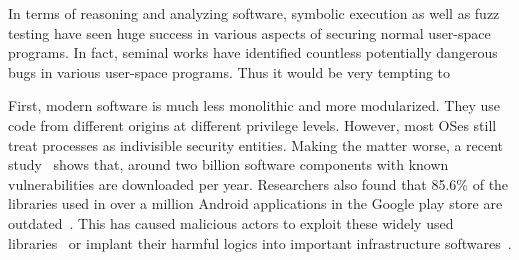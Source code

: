 In terms of reasoning and analyzing software, symbolic execution as well as fuzz testing have seen huge success in various aspects of securing normal user-space programs. In fact, seminal works  have identified countless potentially dangerous bugs in various user-space programs. Thus it would be very tempting to 

First, modern software is much less monolithic and more modularized. They use code from different origins at different privilege levels. 
However, most OSes still treat processes as indivisible security entities. Making the matter worse, a recent study~\cite{enigmasurvey} shows that, around two billion software components with known vulnerabilities are downloaded per year. 
Researchers also found that 85.6\% of the libraries used in over a million Android applications in the Google play store are outdated~\cite{3rdpartysurvey}. 
This has caused malicious actors to exploit these widely used libraries~\cite{taomikesdk,baidusdk,fbsdk,dropboxsdk} or implant their harmful logics into important infrastructure softwares~\cite{xcodeghost}. 

